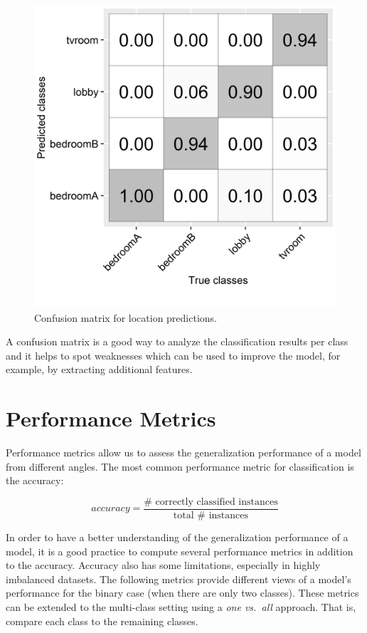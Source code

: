 \documentclass[
  11pt,
]{krantz}
\begin{document}
\begin{figure}

{\centering \includegraphics[width=0.7\linewidth]{images/indoorCM} 

}

\caption{Confusion matrix for location predictions.}\label{fig:wifiCM}
\end{figure}

A confusion matrix is a good way to analyze the classification results per class and it helps to spot weaknesses which can be used to improve the model, for example, by extracting additional features.

\hypertarget{performance-metrics}{%
\section{Performance Metrics}\label{performance-metrics}}

Performance metrics allow us to assess the generalization performance of a model from different angles. The most common performance metric for classification is the accuracy:

\begin{equation}
  accuracy = \frac{\# \textrm{ correctly classified instances}}{\textrm{total } \# \textrm{ instances}}
  \label{eq:metricAccuracy}
\end{equation}

In order to have a better understanding of the generalization performance of a model, it is a good practice to compute several performance metrics in addition to the accuracy. Accuracy also has some limitations, especially in highly imbalanced datasets. The following metrics provide different views of a model's performance for the binary case (when there are only two classes). These metrics can be extended to the multi-class setting using a \emph{one vs.~all} approach. That is, compare each class to the remaining classes.
\end{document}
